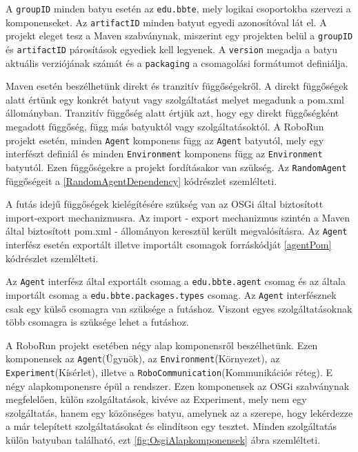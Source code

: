 A \texttt{groupID} minden batyu esetén az \texttt{edu.bbte}, mely logikai csoportokba szervezi a komponenseket. Az \texttt{artifactID} minden batyut egyedi azonosítóval lát el. A projekt eleget tesz a Maven szabványnak, miszerint egy projekten belül a \texttt{groupID} és \texttt{artifactID} párosítások egyediek kell legyenek. A \texttt{version} megadja a batyu aktuális verziójának számát és a \texttt{packaging} a csomagolási formátumot definiálja.

Maven esetén beszélhetünk direkt és tranzitív függőségekről. A direkt függőségek alatt értünk egy konkrét batyut vagy szolgáltatást melyet megadunk a pom.xml állományban. Tranzitív függőség alatt értjük azt, hogy egy direkt függőségként megadott függőség, függ más batyuktól vagy szolgáltatásoktól. A RoboRun projekt esetén, minden \texttt{Agent} komponens függ az \texttt{Agent} batyutól, mely egy interfészt definiál és minden \texttt{Environment} komponens függ az \texttt{Environment} batyutól. Ezen függőségekre a projekt fordításakor van szükség. Az \texttt{RandomAgent} függőségeit a \ref{RandomAgentDependency} kódrészlet szemlélteti.

%


A futás idejű függőségek kielégítésére szükség van az OSGi által biztosított import-export mechanizmusra. Az import - export mechanizmus szintén a Maven által biztosított pom.xml - állományon keresztül került megvalósításra. Az \texttt{Agent} interfész esetén exportált illetve importált csomagok forráskódját \ref{agentPom} kódrészlet szemlélteti.




Az \texttt{Agent} interfész által exportált csomag a \texttt{edu.bbte.agent} csomag és az általa importált csomag a \texttt{edu.bbte.packages.types} csomag. Az \texttt{Agent} interfésznek csak egy külső csomagra van szüksége a futáshoz. Viszont egyes szolgáltatásoknak több csomagra is szüksége lehet a futáshoz.

A RoboRun projekt esetében négy alap komponensről beszélhetünk. Ezen komponensek az \texttt{Agent}(Ügynök), az \texttt{Environment}(Környezet), az \texttt{Experiment}(Kísérlet), illetve a \texttt{RoboCommunication}(Kommunikációs réteg). E négy alapkomponensre épül a rendszer. Ezen komponensek az OSGi szabványnak megfelelően, külön szolgáltatások, kivéve az Experiment, mely nem egy szolgáltatás, hanem egy közönséges batyu, amelynek az a szerepe, hogy lekérdezze a már telepített szolgáltatásokat és elindítson egy tesztet. Minden szolgáltatás külön batyuban található, ezt \ref{fig:OsgiAlapkomponensek} ábra szemlélteti. 

